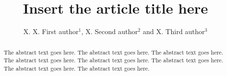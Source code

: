 \documentclass{rsproca}%
\begin{document}
\title{Insert the article title here}

\author{%
X. X. First author$^{1}$, X. Second author$^{2}$ and X. Third author$^{3}$}

\address{$^{1}$First author address\\
$^{2}$Second author address\\
$^{3}$Third author address}

\subject{xxxxx, xxxxx, xxxx}



\begin{abstract}
The abstract text goes here. The abstract text goes here. The abstract text goes here. The abstract text goes here.
The abstract text goes here. The abstract text goes here. The abstract text goes here. The abstract text goes here.
\end{abstract}

\end{document}
